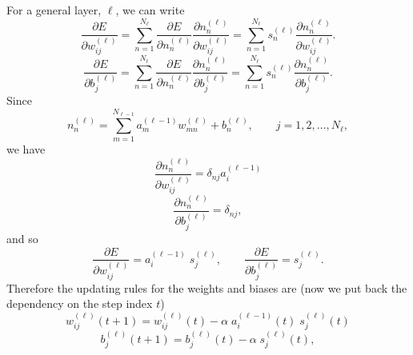 \documentclass[fleqn]{article}
\begin{document}
For a general layer, $\ell$, we can write
\[
\frac{\partial E}{\partial w_{ij}^{(\ell)}} = \sum_{n=1}^{N_\ell} \frac{\partial E}{\partial n_{n}^{(\ell)}}
\frac{\partial n_{n}^{(\ell)}}{\partial w_{ij}^{(\ell)}} =
\sum_{n=1}^{N_\ell} s_{n}^{(\ell)} \frac{\partial n_{n}^{(\ell)}}{\partial w_{ij}^{(\ell)}}.
\]
\[
\frac{\partial E}{\partial b_{j}^{(\ell)}} = \sum_{n=1}^{N_\ell} \frac{\partial E}{\partial n_{n}^{(\ell)}}
\frac{\partial n_{n}^{(\ell)}}{\partial b_{j}^{(\ell)}} =
\sum_{n=1}^{N_\ell} s_{n}^{(\ell)} \frac{\partial n_{n}^{(\ell)}}{\partial b_{j}^{(\ell)}}.
\]
Since
\[
n_n^{(\ell)} = \sum_{m=1}^{N_{\ell-1}} a_m^{(\ell-1)} w_{mn}^{(\ell)} + b_n^{(\ell)}, \qquad
j=1, 2, \ldots, N_\ell,
\]
we have
\[
\frac{\partial n_{n}^{(\ell)}}{\partial w_{ij}^{(\ell)}} = \delta_{nj} a_i^{(\ell-1)}
\]
\[
\frac{\partial n_{n}^{(\ell)}}{\partial b_{j}^{(\ell)}} = \delta_{nj} ,
\]
and so
\[
\frac{\partial E}{\partial w_{ij}^{(\ell)}} = a_i^{(\ell-1)} \;
s_j^{(\ell)},
\qquad \frac{\partial E}{\partial b_{j}^{(\ell)}} =
s_j^{(\ell)}.
\]
Therefore the updating rules for the weights and biases are (now we
put back the dependency on the step index $t$)
\[
w_{ij}^{(\ell)}(t+1) = w_{ij}^{(\ell)}(t) - \alpha \; a_i^{(\ell-1)}(t) \; s_j^{(\ell)}(t)
\]
\[
b_{j}^{(\ell)}(t+1) = b_{j}^{(\ell)}(t) - \alpha \; s_j^{(\ell)}(t),
\]
\end{document}
